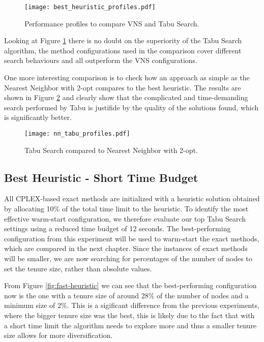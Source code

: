 \begin{figure}[h]
  \centering
  \texttt{[image: best\_heuristic\_profiles.pdf]}
  \caption{Performance profiles to compare VNS and Tabu Search.}
  \label{fig:best-heuristic-profiles}
\end{figure}

Looking at Figure \ref{fig:best-heuristic-profiles} there is no doubt on the superiority of the Tabu Search algorithm, the method configurations used in the comparison cover different search behaviours and all outperform the VNS configurations.

One more interesting comparison is to check how an approach as simple as the Nearest Neighbor with 2-opt compares to the best heuristic. The results are shown in Figure \ref{fig:nn-vs-best-heuristic} and clearly show that the complicated and time-demanding search performed by Tabu is justifide by the quality of the solutions found, which is significantly better.

\begin{figure}[H]
  \centering
  \texttt{[image: nn\_tabu\_profiles.pdf]}
  \caption{Tabu Search compared to Nearest Neighbor with 2-opt.}
  \label{fig:nn-vs-best-heuristic}
\end{figure}

\subsection{Best Heuristic - Short Time Budget}
\label{ssec:short-heuristic}
All CPLEX-based exact methods are initialized with a heuristic solution obtained by allocating 10\% of the total time limit to the heuristic. To identify the most effective warm-start configuration, we therefore evaluate our top Tabu Search settings using a reduced time budget of 12 seconds. The best-performing configuration from this experiment will be used to warm-start the exact methods, which are compared in the next chapter. Since the instances of exact methods will be smaller, we are now searching for percentages of the number of nodes to set the tenure size, rather than absolute values.

From Figure \ref{fig:fast-heuristic} we can see that the best-performing configuration now is the one with a tenure size of around 28\% of the number of nodes and a minimum size of 2\%. This is a sigificant difference from the previous experiments, where the bigger tenure size was the best, this is likely due to the fact that with a short time limit the algorithm needs to explore more and thus a smaller tenure size allows for more diversification.

